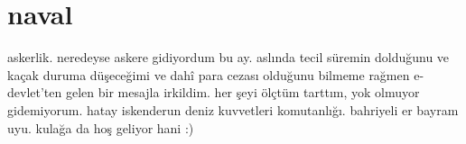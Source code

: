 \documentclass[9pt, a5paper, twocolumn, openright]{memoir}
\begin{document}
\section{naval}
askerlik. neredeyse askere gidiyordum bu ay. aslında tecil süremin
dolduğunu ve kaçak duruma düşeceğimi ve dahî para cezası olduğunu bilmeme
rağmen e-devlet’ten gelen bir mesajla irkildim. her şeyi ölçtüm tarttım,
yok olmuyor gidemiyorum. hatay iskenderun deniz kuvvetleri komutanlığı.
bahriyeli er bayram uyu. kulağa da hoş geliyor hani :)
\end{document}
